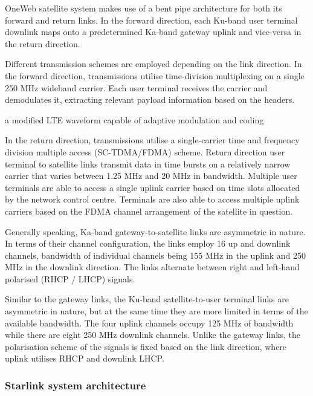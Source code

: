 \documentclass[english, 12pt, a4paper, elec, utf8, a-1b, online]{aaltothesis}
\begin{document}
OneWeb satellite system makes use of a bent pipe architecture for both its forward and return links. In the forward direction, each Ku-band user terminal downlink maps onto a predetermined Ka-band gateway uplink and vice-versa in the return direction. \cite{worldvu2016loi, portillo2019technical}

Different transmission schemes are employed depending on the link direction. In the forward direction, transmissions utilise time-division multiplexing on a single 250 MHz wideband carrier. Each user terminal receives the carrier and demodulates it, extracting relevant payload information based on the headers. \cite{worldvu2016loi}

a modified LTE waveform capable
of adaptive modulation and coding \cite{allen2022terrestrial}

In the return direction, transmissions utilise a single-carrier time and frequency division multiple access (SC-TDMA/FDMA) scheme. Return direction user terminal to satellite links transmit data in time bursts on a relatively narrow carrier that varies between 1.25 MHz and 20 MHz in bandwidth. Multiple user terminals are able to access a single uplink carrier based on time slots allocated by the network control centre. Terminals are also able to access multiple uplink carriers based on the FDMA channel arrangement of the satellite in question. \cite{worldvu2016loi}

Generally speaking, Ka-band gateway-to-satellite links are asymmetric in nature. In terms of their channel configuration, the links employ 16 up and downlink channels, bandwidth of individual channels being 155 MHz in the uplink and 250 MHz in the downlink direction. The links alternate between right and left-hand polarised (RHCP / LHCP) signals. \cite{portillo2019technical}

Similar to the gateway links, the Ku-band satellite-to-user terminal links are asymmetric in nature, but at the same time they are more limited in terms of the available bandwidth. The four uplink channels occupy 125 MHz of bandwidth while there are eight 250 MHz downlink channels. Unlike the gateway links, the polarisation scheme of the signals is fixed based on the link direction, where uplink utilises RHCP and downlink LHCP. \cite{portillo2019technical}

\subsubsection{Starlink system architecture}
\end{document}

